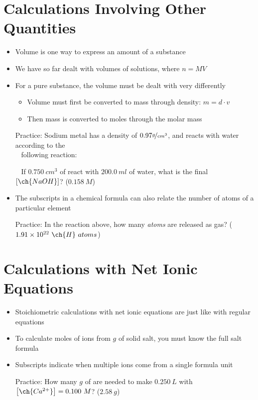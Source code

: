 \documentclass[12pt, openany, letterpaper]{memoir}
\begin{document}
\section{Calculations Involving Other Quantities}
\begin{itemize}
	\item Volume is one way to express an amount of a substance
	\item We have so far dealt with volumes of solutions, where $n=MV$
	\item For a pure substance, the volume must be dealt with very differently
	      \begin{itemize}
		      \item Volume must first be converted to mass through density: $m=d\cdot v$
		      \item Then mass is converted to moles through the molar mass
	      \end{itemize}

	      Practice: Sodium metal has a density of $0.97\nicefrac{g}{cm^3}$, and reacts with water according to the\\
	      ~\hphantom{Practice: } following reaction: 

	      ~\hphantom{Practice:} If $0.750~cm^3$ of  react with $200.0~ml$ of water, what is the final $\left[\ch{NaOH}\right]$? \hspace{1em} ($0.158~M$)
	\item The subscripts in a chemical formula can also relate the number of atoms of a particular element

	      Practice: In the reaction above, how many  \emph{atoms} are released as gas? \hspace{1em} ($1.91\times10^{22}~\ch{H}~atoms$)
\end{itemize}
\section{Calculations with Net Ionic Equations}
\begin{itemize}
	\item Stoichiometric calculations with net ionic equations are just like with regular equations
	\item To calculate moles of ions from $g$ of solid salt, you must know the full salt formula
	\item Subscripts indicate when multiple ions come from a single formula unit

	      Practice: How many $g$ of  are needed to make $0.250~L$ with $\left[\ch{Ca^{2+}}\right]=0.100~M$? \hspace{1em} ($2.58~g$)
\end{itemize}
\end{document}
